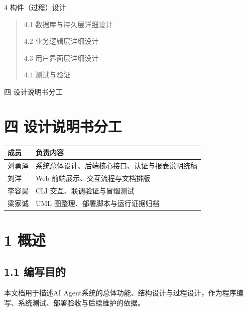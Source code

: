 \documentclass[UTF8]{ctexart}
\begin{document}
4 构件（过程）设计

\begin{quote}
4.1 数据库与持久层详细设计

4.2 业务逻辑层详细设计

4.3 用户界面层详细设计

4.4 测试与验证
\end{quote}

四 设计说明书分工

\section{\texorpdfstring{\textbf{四
设计说明书分工}}{四 设计说明书分工}}\label{ux56db-ux8bbeux8ba1ux8bf4ux660eux4e66ux5206ux5de5}

\begin{longtable}[]{@{}
  >{\raggedright\arraybackslash}p{}
  >{\raggedright\arraybackslash}p{}@{}}
\toprule\noalign{}
\begin{minipage}[b]{\linewidth}\raggedright
成员
\end{minipage} & \begin{minipage}[b]{\linewidth}\raggedright
负责内容
\end{minipage} \\
\midrule\noalign{}
\endhead
\bottomrule\noalign{}
\endlastfoot
刘勇泽 & 系统总体设计、后端核心接口、认证与报表说明统稿 \\
刘洋 & Web 前端展示、交互流程与文档排版 \\
李容昊 & CLI 交互、联调验证与冒烟测试 \\
梁家诚 & UML 图整理、部署脚本与运行证据归档 \\
\end{longtable}

\section{\texorpdfstring{\textbf{1 概述}}{1 概述}}\label{ux6982ux8ff0}

\subsection{\texorpdfstring{\textbf{1.1
编写目的}}{1.1 编写目的}}\label{ux7f16ux5199ux76eeux7684}

本文档用于描述AI
Agent系统的总体功能、结构设计与过程设计，作为程序编写、系统测试、部署验收与后续维护的依据。
\end{document}

